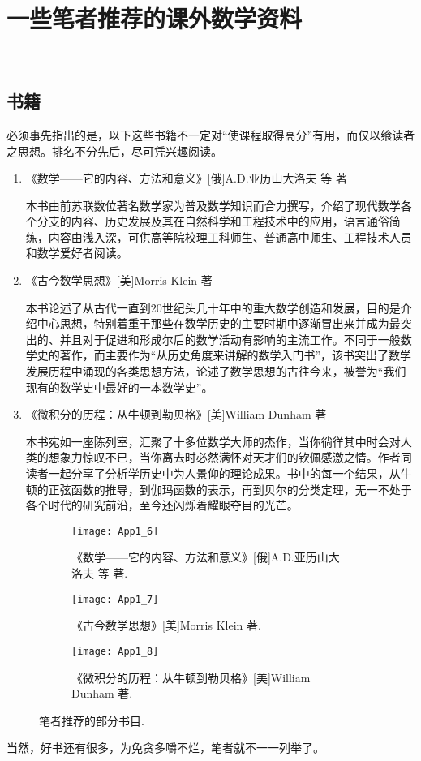 \section{一些笔者推荐的课外数学资料}
~
  \subsection{书籍}
    \hspace*{2em}必须事先指出的是，以下这些书籍不一定对“使课程取得高分”有用，而仅以飨读者之思想。排名不分先后，尽可凭兴趣阅读。
  \begin{enumerate}[label=(\arabic*),leftmargin=4em]
    \item 《数学——它的内容、方法和意义》[俄]A.D.亚历山大洛夫 等 著

    本书由前苏联数位著名数学家为普及数学知识而合力撰写，介绍了现代数学各个分支的内容、历史发展及其在自然科学和工程技术中的应用，语言通俗简练，内容由浅入深，可供高等院校理工科师生、普通高中师生、工程技术人员和数学爱好者阅读。

    \item 《古今数学思想》[美]Morris Klein 著

    本书论述了从古代一直到20世纪头几十年中的重大数学创造和发展，目的是介绍中心思想，特别着重于那些在数学历史的主要时期中逐渐冒出来并成为最突出的、并且对于促进和形成尔后的数学活动有影响的主流工作。不同于一般数学史的著作，而主要作为“从历史角度来讲解的数学入门书”，该书突出了数学发展历程中涌现的各类思想方法，论述了数学思想的古往今来，被誉为“我们现有的数学史中最好的一本数学史”。

    \item 《微积分的历程：从牛顿到勒贝格》[美]William Dunham 著

    本书宛如一座陈列室，汇聚了十多位数学大师的杰作，当你徜徉其中时会对人类的想象力惊叹不已，当你离去时必然满怀对天才们的钦佩感激之情。作者同读者一起分享了分析学历史中为人景仰的理论成果。书中的每一个结果，从牛顿的正弦函数的推导，到伽玛函数的表示，再到贝尔的分类定理，无一不处于各个时代的研究前沿，至今还闪烁着耀眼夺目的光芒。
  \end{enumerate}
    \begin{figure}[!htb]
    \hfill
    \begin{subfigure}[b]{.2\textwidth}
      \centering
      \texttt{[image: App1\_6]}
      \caption{《数学——它的内容、方法和意义》[俄]A.D.亚历山大洛夫 等 著.}
    \end{subfigure}
    \hfill
    \begin{subfigure}[b]{.2\textwidth}
      \centering
      \texttt{[image: App1\_7]}
      \caption{《古今数学思想》[美]Morris Klein 著.}
    \end{subfigure}
    \hfill
    \begin{subfigure}[b]{.2\textwidth}
      \centering
      \texttt{[image: App1\_8]}
      \caption{《微积分的历程：从牛顿到勒贝格》[美]William Dunham 著.}
    \end{subfigure}
    \caption{笔者推荐的部分书目.}
  \end{figure}
  \hspace*{2em}当然，好书还有很多，为免贪多嚼不烂，笔者就不一一列举了。

